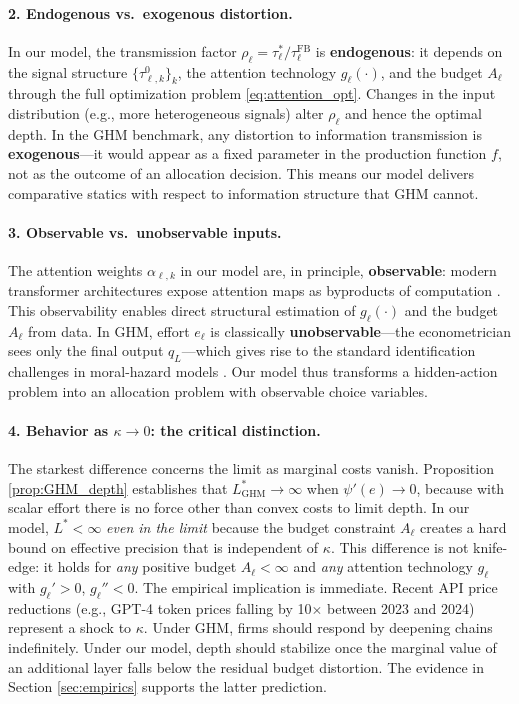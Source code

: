 \paragraph{2. Endogenous vs.~exogenous distortion.} In our model, the transmission factor $\rho_\ell = \tau^*_\ell / \tau^{\text{FB}}_\ell$ is \textbf{endogenous}: it depends on the signal structure $\{\tau^0_{\ell,k}\}_k$, the attention technology $g_\ell(\cdot)$, and the budget $A_\ell$ through the full optimization problem \eqref{eq:attention_opt}. Changes in the input distribution (e.g., more heterogeneous signals) alter $\rho_\ell$ and hence the optimal depth. In the GHM benchmark, any distortion to information transmission is \textbf{exogenous}---it would appear as a fixed parameter in the production function $f$, not as the outcome of an allocation decision. This means our model delivers comparative statics with respect to information structure that GHM cannot.

\paragraph{3. Observable vs.~unobservable inputs.} The attention weights $\alpha_{\ell,k}$ in our model are, in principle, \textbf{observable}: modern transformer architectures expose attention maps as byproducts of computation \citep{vaswani2017attention}. This observability enables direct structural estimation of $g_\ell(\cdot)$ and the budget $A_\ell$ from data. In GHM, effort $e_\ell$ is classically \textbf{unobservable}---the econometrician sees only the final output $q_L$---which gives rise to the standard identification challenges in moral-hazard models \citep{chiappori2015identification}. Our model thus transforms a hidden-action problem into an allocation problem with observable choice variables.

\paragraph{4. Behavior as $\kappa \to 0$: the critical distinction.} The starkest difference concerns the limit as marginal costs vanish. Proposition \ref{prop:GHM_depth} establishes that $L^*_{\text{GHM}} \to \infty$ when $\psi'(e) \to 0$, because with scalar effort there is no force other than convex costs to limit depth. In our model, $L^* < \infty$ \emph{even in the limit} because the budget constraint $A_\ell$ creates a hard bound on effective precision that is independent of $\kappa$. This difference is not knife-edge: it holds for \emph{any} positive budget $A_\ell < \infty$ and \emph{any} attention technology $g_\ell$ with $g_\ell' > 0$, $g_\ell'' < 0$. The empirical implication is immediate. Recent API price reductions (e.g., GPT-4 token prices falling by 10$\times$ between 2023 and 2024) represent a shock to $\kappa$. Under GHM, firms should respond by deepening chains indefinitely. Under our model, depth should stabilize once the marginal value of an additional layer falls below the residual budget distortion. The evidence in Section \ref{sec:empirics} supports the latter prediction.

